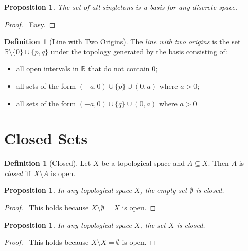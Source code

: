 \documentclass{report}
\let\qed\relax
\newtheorem{prop}[lm]{Proposition}
\theoremstyle{definition}
\newtheorem{df}[lm]{Definition}
\begin{document}
  \begin{prop}
    The set of all singletons is a basis for any discrete space.
  \end{prop}

  \begin{proof}
    \pf\ Easy. \qed
  \end{proof}

   \begin{df}[Line with Two Origins]
   The \emph{line with two origins} is the set $\mathbb{R} \setminus \{ 0 \}
   \cup \{ p,q \}$ under the topology generated by the basis consisting of:
   \begin{itemize}
     \item all open intervals in $\mathbb{R}$ that do not contain $0$;
     \item all sets of the form $(-a, 0) \cup \{ p \} \cup (0, a)$ where $a
> 0$;
\item all sets of the form $(-a, 0) \cup \{ q \} \cup (0, a)$ where $a > 0$
   \end{itemize}
 \end{df}

  \section{Closed Sets}

  \begin{df}[Closed]
    Let $X$ be a topological space and $A \subseteq X$. Then $A$ is
    \emph{closed}
    iff $X \setminus A$ is open.
  \end{df}

  \begin{prop}
    \label{prop:topology:closed:empty}
    In any topological space $X$, the empty set $\emptyset$ is closed.
  \end{prop}

  \begin{proof}
    \pf\ This holds because $X \setminus \emptyset = X$ is open. \qed
  \end{proof}

  \begin{prop}
    \label{prop:topology:closed:whole_set}
    In any topological space $X$, the set $X$ is closed.
  \end{prop}

  \begin{proof}
    \pf\ This holds because $X \setminus X = \emptyset$ is open. \qed
  \end{proof}
\end{document}

